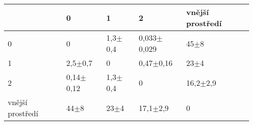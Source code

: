 \begin{tabular}{lllll}
\toprule
{} &            0 &          1 &              2 & vnější prostředí \\
\midrule
0                &            0 &  1,3$\pm$0,4 &  0,033$\pm$0,029 &           45$\pm$8 \\
1                &    2,5$\pm$0,7 &          0 &    0,47$\pm$0,16 &           23$\pm$4 \\
2                &  0,14$\pm$0,12 &  1,3$\pm$0,4 &              0 &       16,2$\pm$2,9 \\
vnější prostředí &       44$\pm$8 &     23$\pm$4 &     17,1$\pm$2,9 &                0 \\
\bottomrule
\end{tabular}
